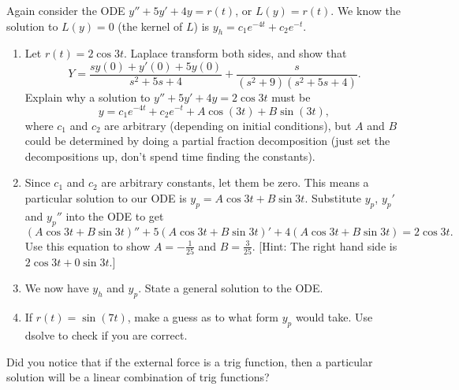 \begin{problem}
Again consider the ODE $y''+5y'+4y=r(t)$, or $L(y)=r(t)$. We know the solution to $L(y)=0$ (the kernel of $L$) is $y_h = c_1 e^{-4t}+c_2e^{-t}$.
\begin{enumerate}
 \item Let $r(t)=2\cos 3t$.  Laplace transform both sides, and show that 
$$
Y=
\dfrac{sy(0)+y'(0)+5y(0)}{s^2+5s+4}
+\dfrac{s}{(s^2+9)(s^2+5s+4)}
.$$ Explain why a solution to $y''+5y'+4y=2\cos 3t$ must be $$y=c_1 e^{-4t}+c_2e^{-t}+A\cos(3t)+B\sin(3t),$$ where $c_1$ and $c_2$ are arbitrary (depending on initial conditions), but $A$ and $B$ could be determined by doing a partial fraction decomposition (just set the decompositions up, don't spend time finding the constants).
 \item Since $c_1$ and $c_2$ are arbitrary constants, let them be zero. This means a particular solution to our ODE is $y_p=A\cos 3t+B\sin 3t$.  Substitute $y_p$, $y_p'$ and $y_p''$ into the ODE to get
$$
(A\cos 3t+B\sin 3t)'' + 5(A\cos 3t+B\sin 3t)'+4(A\cos 3t+B\sin 3t)=2\cos 3t
.$$ Use this equation to show $A = -\frac{1}{25}$ and $B=\frac{3}{25}$. [Hint: The right hand side is $2\cos 3t+0\sin 3t$.]
 \item We now have $y_h$ and $y_p$. State a general solution to the ODE. 
 \item If $r(t) = \sin(7t)$, make a guess as to what form $y_p$ would take.  Use dsolve to check if you are correct. 
\end{enumerate}

\end{problem}

Did you notice that if the external force is a trig function, then a particular solution will be a linear combination of trig functions?

